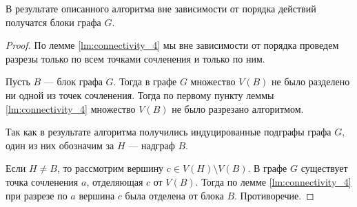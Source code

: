 \begin{theorem}
    В результате описанного алгоритма вне зависимости от порядка действий получатся блоки графа $G$.
\end{theorem}
\begin{proof}
	По лемме \ref{lm:connectivity_4} мы вне зависимости от порядка проведем разрезы только по всем точками сочленения и только по ним.

	Пусть $B$ --- блок графа $G$. Тогда в графе $G$ множество $V(B) $ не было разделено ни одной из точек сочленения. Тогда по первому пункту леммы \ref{lm:connectivity_4} множество $V(B)$ не было разрезано алгоритмом.

	Так как в результате алгоритма получились индуцированные подграфы графа $G$, один из них обозначим за $H$ --- надграф  $B$.

	Если $H \neq B$, то рассмотрим вершину $c \in V(H) \setminus V(B)$. 
	В графе $G$ существует точка сочленения $a$, отделяющая $c$ от $V(B)$. Тогда по лемме  \ref{lm:connectivity_4} при разрезе по $a$ вершина $c$ была отделена от блока $B$. Противоречие. 
    
\end{proof}
